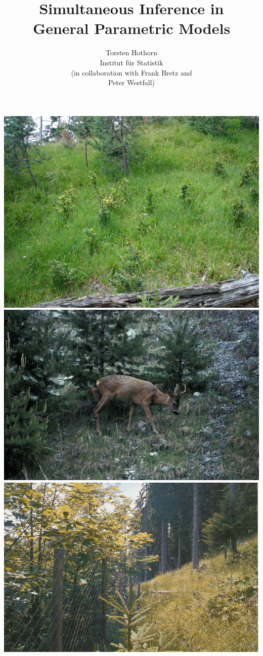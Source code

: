 \documentclass[landscape]{slides}
\title{Simultaneous Inference in \\ General Parametric Models}
\author{Torsten Hothorn \\ Institut für Statistik \\ 
(in collaboration with Frank Bretz and \\ Peter Westfall)}
\begin{document}
\maketitle


\begin{center}
\includegraphics{figs/verbiss}
\includegraphics{figs/reh}
\includegraphics{figs/zaun}

\end{center}
\end{document}
